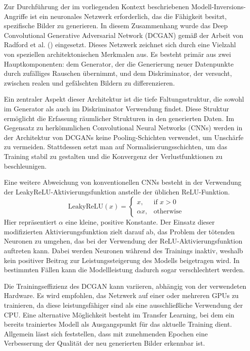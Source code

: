 Zur Durchführung der im vorliegenden Kontext beschriebenen Modell-Inversions-Angriffe ist ein neuronales Netzwerk erforderlich, das die Fähigkeit besitzt, spezifische Bilder zu generieren. In diesem Zusammenhang wurde das Deep Convolutional Generative Adversarial Network (DCGAN) gemäß der Arbeit von Radford et al. (\cite{radford_unsupervised_2016}) eingesetzt. Dieses Netzwerk zeichnet sich durch eine Vielzahl von speziellen architektonischen Merkmalen aus. Es besteht primär aus zwei Hauptkomponenten: dem Generator, der die Generierung neuer Datenpunkte durch zufälliges Rauschen übernimmt, und dem Diskriminator, der versucht, zwischen realen und gefälschten Bildern zu differenzieren.

Ein zentraler Aspekt dieser Architektur ist die tiefe Faltungsstruktur, die sowohl im Generator als auch im Diskriminator Verwendung findet. Diese Struktur ermöglicht die Erfassung räumlicher Strukturen in den generierten Daten. Im Gegensatz zu herkömmlichen Convolutional Neural Networks (CNNs) werden in der Architektur von DCGANs keine Pooling-Schichten verwendet, um Unschärfe zu vermeiden. Stattdessen setzt man auf Normalisierungsschichten, um das Training stabil zu gestalten und die Konvergenz der Verlustfunktionen zu beschleunigen.

Eine weitere Abweichung von konventionellen CNNs besteht in der Verwendung der LeakyReLU-Aktivierungsfunktion anstelle der üblichen ReLU-Funktion.
\begin{equation}
	\text{LeakyReLU}(x) = \begin{cases}
		x, & \text{if } x > 0 \\
		\alpha x, & \text{otherwise}
	\end{cases}
\end{equation}
Hier repräsentiert $\alpha$ eine kleine, positive Konstante. Der Einsatz dieser modifizierten Aktivierungsfunktion zielt darauf ab, das Problem der \glqq tötenden Neuronen\grqq{} zu umgehen, das bei der Verwendung der ReLU-Aktivierungsfunktion auftreten kann. Dabei werden Neuronen während des Trainings inaktiv, weshalb kein positiver Beitrag zur Leistungssteigerung des Modells beigetragen wird. In bestimmten Fällen kann die Modellleistung dadurch sogar verschlechtert werden. 

Die Trainingseffizienz des DCGAN kann variieren, abhängig von der verwendeten Hardware. Es wird empfohlen, das Netzwerk auf einer oder mehreren GPUs zu trainieren, da diese leistungsfähiger sind als eine ausschließliche Verwendung der CPU. Eine alternative Möglichkeit besteht im Transfer Learning, bei dem ein bereits trainiertes Modell als Ausgangspunkt für das aktuelle Training dient. Allgemein lässt sich feststellen, dass mit zunehmenden Epochen eine Verbesserung der Qualität der neu generierten Bilder erkennbar ist.

